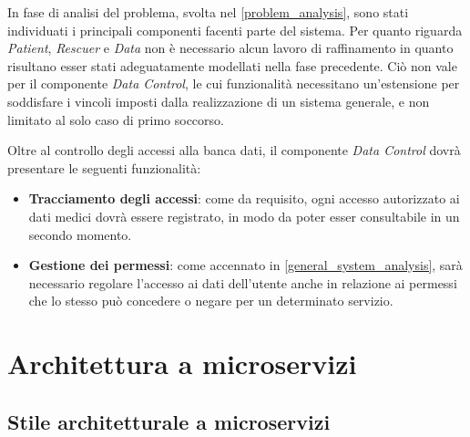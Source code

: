\documentclass[a4paper,12pt]{report}
\begin{document}
In fase di analisi del problema, svolta nel \autoref{problem_analysis}, sono stati individuati i principali componenti facenti parte del sistema. Per quanto riguarda \emph{Patient}, \emph{Rescuer} e \emph{Data} non è necessario alcun lavoro di raffinamento in quanto risultano esser stati adeguatamente modellati nella fase precedente. Ciò non vale per il componente \emph{Data Control}, le cui funzionalità necessitano un'estensione per soddisfare i vincoli imposti dalla realizzazione di un sistema generale, e non limitato al solo caso di primo soccorso.

Oltre al controllo degli accessi alla banca dati, il componente \emph{Data Control} dovrà presentare le seguenti funzionalità:
\begin{itemize}
	\item \textbf{Tracciamento degli accessi}: come da requisito, ogni accesso autorizzato ai dati medici dovrà essere registrato, in modo da poter esser consultabile in un secondo momento.
	\item \textbf{Gestione dei permessi}: come accennato in \autoref{general_system_analysis}, sarà necessario regolare l'accesso ai dati dell'utente anche in relazione ai permessi che lo stesso può concedere o negare per un determinato servizio.
\end{itemize}

\section{Architettura a microservizi}

\subsection{Stile architetturale a microservizi}
\end{document}
